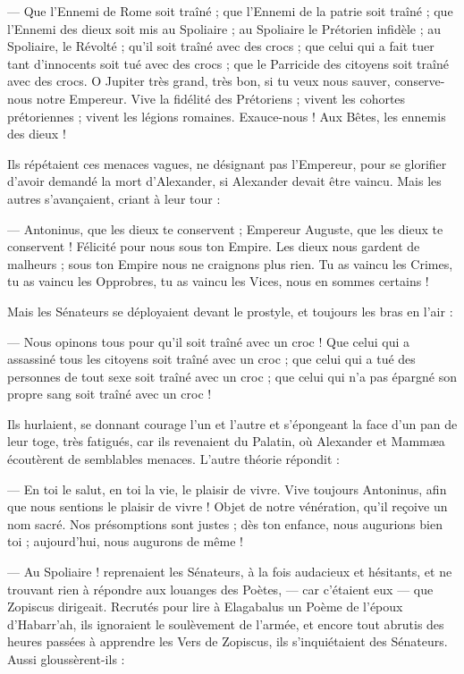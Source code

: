 \documentclass[a4paper, 11pt, oneside, polutonikogreek, french]{article}
\begin{document}
--- Que l'Ennemi de Rome soit traîné ; que l'Ennemi de la patrie soit traîné ; que l'Ennemi des dieux soit mis au Spoliaire ; au Spoliaire le Prétorien infidèle ; au Spoliaire, le Révolté ; qu'il soit traîné avec des crocs ; que celui qui a fait tuer tant d'innocents soit tué avec des crocs ; que le Parricide des citoyens soit traîné avec des crocs. O Jupiter très grand, très bon, si tu veux nous sauver, conserve-nous notre Empereur. Vive la fidélité des Prétoriens ; vivent les cohortes prétoriennes ; vivent les légions romaines. Exauce-nous ! Aux Bêtes, les ennemis des dieux !

Ils répétaient ces menaces vagues, ne désignant pas l'Empereur, pour se glorifier d'avoir demandé la mort d'Alexander, si Alexander devait être vaincu. Mais les autres s'avançaient, criant à leur tour :

--- Antoninus, que les dieux te conservent ; Empereur Auguste, que les dieux te conservent ! Félicité pour nous sous ton Empire. Les dieux nous gardent de malheurs ; sous ton Empire nous ne craignons plus rien. Tu as vaincu les Crimes, tu as vaincu les Opprobres, tu as vaincu les Vices, nous en sommes certains !

Mais les Sénateurs se déployaient devant le prostyle, et toujours les bras en l'air :

--- Nous opinons tous pour qu'il soit traîné avec un croc ! Que celui qui a assassiné tous les citoyens soit traîné avec un croc ; que celui qui a tué des personnes de tout sexe soit traîné avec un croc ; que celui qui n'a pas épargné son propre sang soit traîné avec un croc !

Ils hurlaient, se donnant courage l'un et l'autre et s'épongeant la face d'un pan de leur toge, très fatigués, car ils revenaient du Palatin, où Alexander et Mammæa écoutèrent de semblables menaces. L'autre théorie répondit :

--- En toi le salut, en toi la vie, le plaisir de vivre. Vive toujours Antoninus, afin que nous sentions le plaisir de vivre ! Objet de notre vénération, qu'il reçoive un nom sacré. Nos présomptions sont justes ; dès ton enfance, nous augurions bien toi ; aujourd'hui, nous augurons de même !

--- Au Spoliaire ! reprenaient les Sénateurs, à la fois audacieux et hésitants, et ne trouvant rien à répondre aux louanges des Poètes, --- car c'étaient eux --- que Zopiscus dirigeait. Recrutés pour lire à Elagabalus un Poème de l'époux d'Habarr'ah, ils ignoraient le soulèvement de l'armée, et encore tout abrutis des heures passées à apprendre les Vers de Zopiscus, ils s'inquiétaient des Sénateurs. Aussi gloussèrent-ils :
\end{document}
